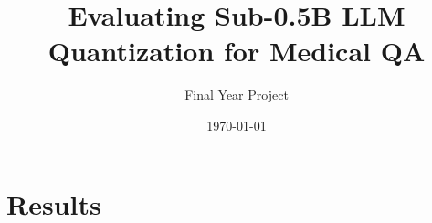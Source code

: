 \documentclass{article}
\title{Evaluating Sub-0.5B LLM Quantization for Medical QA}
\author{Final Year Project}
\date{\today}
\begin{document}
\maketitle
\section{Results}

\end{document}
